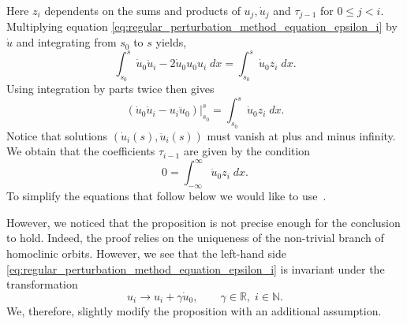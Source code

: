 Here $z_i$ dependents on the sums and products of $u_j, \dot u_j$ and $\tau_{j-1}$
for $0\leq j < i$.  Multiplying equation
\cref{eq:regular_perturbation_method_equation_epsilon_i} by $\dot u$ and
integrating from $s_0$ to $s$ yields,
\[
  \int_{s_0}^s \dot u_0 \ddot u_i - 2 \dot u_0 u_0 u_i \;dx = \int_{s_0}^s \dot
  u_0 z_i \; dx.
\]
Using integration by parts twice then gives
\begin{equation}
  \label{eq:regular_perturbation_method_integration_by_parts}
  \left. \left( \dot u_0 \dot u_i - u_i \ddot u_0 \right)\right|_{s_0}^s = \int_{s_0}^s \dot
  u_0 z_i \; dx.
\end{equation}
Notice that solutions $(\dot u_i(s),\ddot u_i(s))$ must vanish at plus and minus
infinity. We obtain that the coefficients $\tau_{i-1}$ are given by the condition
\begin{equation*}
    0 = \int_{-\infty}^\infty \dot u_0 z_i \; dx.
\end{equation*}
To simplify the equations that follow below we would like to
use~\cite[Proposition 4.2]{Beyn_1994}. 

However, we noticed that the proposition is not precise enough for the
conclusion to hold. Indeed, the proof relies on the uniqueness of the
non-trivial branch of homoclinic orbits. However, we see that the left-hand
side \cref{eq:regular_perturbation_method_equation_epsilon_i} is invariant
under the transformation
\[
u_i \to u_i + \gamma \dot u_0, \qquad \gamma \in\mathbb R, \; i\in\mathbb N.
\]
We, therefore, slightly modify the proposition with an additional assumption.

